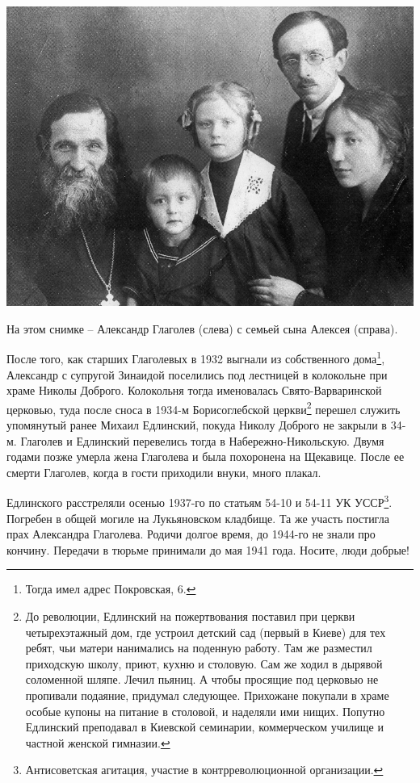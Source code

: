 \begin{center}
\includegraphics[width=\linewidth]{chast-colebanie-osnov/borichev-tok/glagol-01.jpg}
\end{center}

На этом снимке – Александр Глаголев (слева) с семьей сына Алексея (справа).

После того, как старших Глаголевых в 1932 выгнали из собственного дома\footnote{Тогда имел адрес Покровская, 6.}, Александр с супругой Зинаидой поселились под лестницей в колокольне при храме Николы Доброго. Колокольня тогда именовалась Свято-Варваринской церковью, туда после сноса в 1934-м Борисоглебской церкви\footnote{До революции, Едлинский на пожертвования поставил при церкви четырехэтажный дом, где устроил детский сад (первый в Киеве) для тех ребят, чьи матери нанимались на поденную работу. Там же разместил приходскую школу, приют, кухню и столовую. Сам же ходил в дырявой соломенной шляпе. Лечил пьяниц. А чтобы просящие под церковью не пропивали подаяние, придумал следующее. Прихожане покупали в храме особые купоны на питание в столовой, и наделяли ими нищих. Попутно Едлинский преподавал в Киевской семинарии, коммерческом училище и частной женской гимназии.} перешел служить упомянутый ранее Михаил Едлинский, покуда Николу Доброго не закрыли в 34-м. Глаголев и Едлинский перевелись тогда в Набережно-Никольскую. Двумя годами позже умерла жена Глаголева и была похоронена на Щекавице. После ее смерти Глаголев, когда в гости приходили внуки, много плакал. 

Едлинского расстреляли осенью 1937-го по статьям 54-10 и 54-11 УК УССР\footnote{Антисоветская агитация, участие в контрреволюционной организации.}. Погребен в общей могиле на Лукьяновском кладбище. Та же участь постигла прах Александра Глаголева. Родичи долгое время, до 1944-го не знали про кончину. Передачи в тюрьме принимали до мая 1941 года. Носите, люди добрые!

